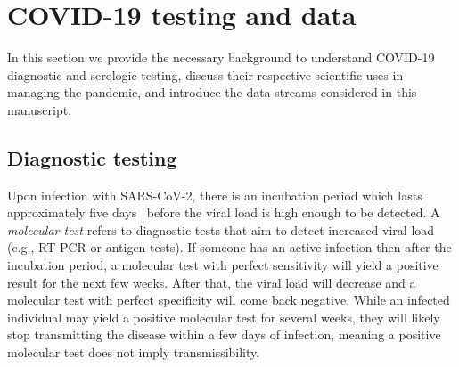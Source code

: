 \documentclass[11pt]{amsart}
\numberwithin{equation}{section}
\theoremstyle{plain}
\begin{document}



\section{COVID-19 testing and data}
\label{section:data}

In this section we provide the necessary background to understand COVID-19 diagnostic and serologic testing, discuss their respective scientific uses in managing the pandemic, and introduce the data streams considered in this manuscript.

\subsection{Diagnostic testing}
\label{section:testinginfo}

Upon infection with SARS-CoV-2, there is an incubation period which lasts approximately five days~\citep{Lauer2020} before the viral load is high enough to be detected.  A \emph{molecular test} refers to diagnostic tests that aim to detect increased viral load (e.g., RT-PCR or antigen tests).  If someone has an active infection then after the incubation period, a molecular test with perfect sensitivity will yield a positive result for the next few weeks.  After that, the viral load will decrease and a molecular test with perfect specificity will come back negative. While an infected individual may yield a positive molecular test for several weeks, they will likely stop transmitting the disease within a few days of infection, meaning a positive molecular test does not imply transmissibility.
\end{document}
